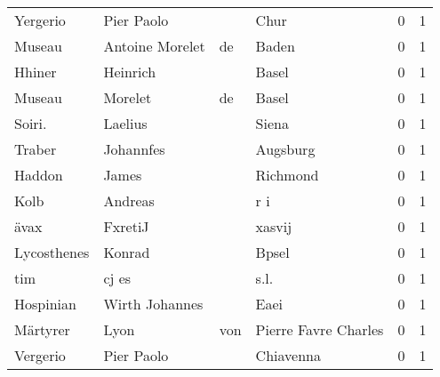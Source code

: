 \documentclass[10pt,a4paper,landscape]{article}
\begin{document}
\begin{longtable}{llllrr}
                 Yergerio &                         Pier Paolo &             &                                        Chur &          0 &         1 \\
                   Museau &                    Antoine Morelet &          de &                                       Baden &          0 &         1 \\
                   Hhiner &                           Heinrich &             &                                       Basel &          0 &         1 \\
                   Museau &                            Morelet &          de &                                       Basel &          0 &         1 \\
                   Soiri. &                            Laelius &             &                                       Siena &          0 &         1 \\
                   Traber &                          Johannfes &             &                                    Augsburg &          0 &         1 \\
                   Haddon &                              James &             &                                    Richmond &          0 &         1 \\
                     Kolb &                            Andreas &             &                                         r i &          0 &         1 \\
                     ävax &                            FxretiJ &             &                                      xasvij &          0 &         1 \\
              Lycosthenes &                             Konrad &             &                                       Bpsel &          0 &         1 \\
                      tim &                              cj es &             &                                        s.l. &          0 &         1 \\
                Hospinian &                     Wirth Johannes &             &                                        Eaei &          0 &         1 \\
                 Märtyrer &                               Lyon &         von &                        Pierre Favre Charles &          0 &         1 \\
                 Vergerio &                         Pier Paolo &             &                                   Chiavenna &          0 &         1 \\

\end{longtable}
\end{document}
